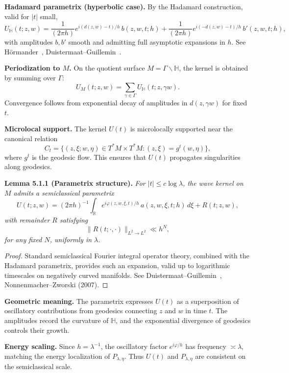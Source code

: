 \noindent\textbf{Hadamard parametrix (hyperbolic case).}
By the Hadamard construction, valid for $|t|$ small,
\[
  U_{\mathbb{H}}(t; z,w) = \frac{1}{(2\pi h)} e^{i(d(z,w)-t)/h}\, b(z,w,t;h)
  + \frac{1}{(2\pi h)} e^{i(-d(z,w)-t)/h}\, b'(z,w,t;h),
\]
with amplitudes $b,b'$ smooth and admitting full asymptotic expansions in $h$.
See Hörmander~\cite{Hormander1994}, Duistermaat–Guillemin~\cite{DG1975}.

\medskip

\noindent\textbf{Periodization to $M$.}
On the quotient surface $M=\Gamma\backslash\mathbb{H}$,
the kernel is obtained by summing over $\Gamma$:
\[
  U_M(t; z,w) = \sum_{\gamma\in \Gamma} U_{\mathbb{H}}(t; z,\gamma w).
\]
Convergence follows from exponential decay of amplitudes in $d(z,\gamma w)$
for fixed $t$.

\medskip

\noindent\textbf{Microlocal support.}
The kernel $U(t)$ is microlocally supported near the canonical relation
\[
  C_t = \{ (z,\xi; w,\eta) \in T^*M\times T^*M : (z,\xi)=g^t(w,\eta)\},
\]
where $g^t$ is the geodesic flow.
This ensures that $U(t)$ propagates singularities along geodesics.

\medskip

\noindent\textbf{Lemma 5.1.1 (Parametrix structure).}
\emph{For $|t|\le c\log \lambda$, the wave kernel on $M$ admits a semiclassical parametrix}
\[
  U(t;z,w) = (2\pi h)^{-1} \int_{\mathbb{R}} e^{i\varphi(z,w,\xi,t)/h}\, a(z,w,\xi,t;h)\, d\xi + R(t;z,w),
\]
\emph{with remainder $R$ satisfying}
\[
  \|R(t;\cdot,\cdot)\|_{L^2\to L^2} \ll h^N,
\]
\emph{for any fixed $N$, uniformly in $\lambda$.}

\begin{proof}
Standard semiclassical Fourier integral operator theory, combined with the Hadamard parametrix,
provides such an expansion, valid up to logarithmic timescales on negatively curved manifolds.
See Duistermaat–Guillemin~\cite{DG1975}, Nonnenmacher–Zworski (2007).
\end{proof}

\medskip

\noindent\textbf{Geometric meaning.}
The parametrix expresses $U(t)$ as a superposition of oscillatory contributions
from geodesics connecting $z$ and $w$ in time $t$.
The amplitudes record the curvature of $\mathbb{H}$,
and the exponential divergence of geodesics controls their growth.

\medskip

\noindent\textbf{Energy scaling.}
Since $h=\lambda^{-1}$, the oscillatory factor $e^{i\varphi/h}$
has frequency $\asymp \lambda$,
matching the energy localization of $P_{\lambda,\eta}$.
Thus $U(t)$ and $P_{\lambda,\eta}$ are consistent on the semiclassical scale.

